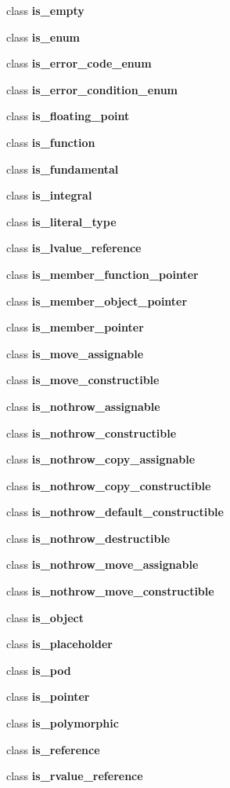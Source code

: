 \begin{DoxyCompactItemize}
\item 
class {\bf is\+\_\+empty}
\item 
class {\bf is\+\_\+enum}
\item 
class {\bf is\+\_\+error\+\_\+code\+\_\+enum}
\item 
class {\bf is\+\_\+error\+\_\+condition\+\_\+enum}
\item 
class {\bf is\+\_\+floating\+\_\+point}
\item 
class {\bf is\+\_\+function}
\item 
class {\bf is\+\_\+fundamental}
\item 
class {\bf is\+\_\+integral}
\item 
class {\bf is\+\_\+literal\+\_\+type}
\item 
class {\bf is\+\_\+lvalue\+\_\+reference}
\item 
class {\bf is\+\_\+member\+\_\+function\+\_\+pointer}
\item 
class {\bf is\+\_\+member\+\_\+object\+\_\+pointer}
\item 
class {\bf is\+\_\+member\+\_\+pointer}
\item 
class {\bf is\+\_\+move\+\_\+assignable}
\item 
class {\bf is\+\_\+move\+\_\+constructible}
\item 
class {\bf is\+\_\+nothrow\+\_\+assignable}
\item 
class {\bf is\+\_\+nothrow\+\_\+constructible}
\item 
class {\bf is\+\_\+nothrow\+\_\+copy\+\_\+assignable}
\item 
class {\bf is\+\_\+nothrow\+\_\+copy\+\_\+constructible}
\item 
class {\bf is\+\_\+nothrow\+\_\+default\+\_\+constructible}
\item 
class {\bf is\+\_\+nothrow\+\_\+destructible}
\item 
class {\bf is\+\_\+nothrow\+\_\+move\+\_\+assignable}
\item 
class {\bf is\+\_\+nothrow\+\_\+move\+\_\+constructible}
\item 
class {\bf is\+\_\+object}
\item 
class {\bf is\+\_\+placeholder}
\item 
class {\bf is\+\_\+pod}
\item 
class {\bf is\+\_\+pointer}
\item 
class {\bf is\+\_\+polymorphic}
\item 
class {\bf is\+\_\+reference}
\item 
class {\bf is\+\_\+rvalue\+\_\+reference}

\end{DoxyCompactItemize}
